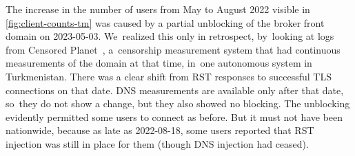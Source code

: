 \documentclass[letterpaper,twocolumn]{article}
\begin{document}
The increase in the number of users from May to August 2022
visible in \autoref{fig:client-counts-tm} was caused by
a partial unblocking of the broker front domain on \mbox{2023-05-03}.
We~realized this only in retrospect,
by~looking at logs from Censored Planet~\cite{Raman2020c},
a~censorship measurement system that had continuous measurements
of the domain at that time, in~one autonomous system in Turkmenistan.
There was a clear shift from RST responses to successful TLS connections on that date.
DNS measurements are available only after that date,
so~they do not show a change, but they also showed no blocking.
The unblocking evidently permitted some users to connect as before.
But it must not have been nationwide, because as late as \mbox{2022-08-18},
some users reported that RST injection was still in place for them
(though DNS injection had ceased).

\end{document}

